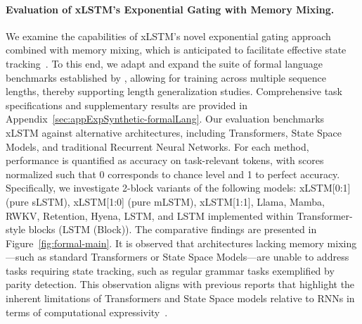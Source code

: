 \paragraph{Evaluation of xLSTM's Exponential Gating with Memory Mixing.} We examine the capabilities of xLSTM's novel exponential gating approach combined with memory mixing, which is anticipated to facilitate effective state tracking~\citep{Merrill:24, Merrill:23}. To this end, we adapt and expand the suite of formal language benchmarks established by \citet{Deletang:23}, allowing for training across multiple sequence lengths, thereby supporting length generalization studies. Comprehensive task specifications and supplementary results are provided in Appendix~\ref{sec:appExpSynthetic-formalLang}. 
Our evaluation benchmarks xLSTM against alternative architectures, including Transformers, State Space Models, and traditional Recurrent Neural Networks. For each method, performance is quantified as accuracy on task-relevant tokens, with scores normalized such that 0 corresponds to chance level and 1 to perfect accuracy. Specifically, we investigate 2-block variants of the following models: xLSTM[0:1] (pure sLSTM), xLSTM[1:0] (pure mLSTM), xLSTM[1:1], Llama, Mamba, RWKV, Retention, Hyena, LSTM, and LSTM implemented within Transformer-style blocks (LSTM (Block)). The comparative findings are presented in Figure~\ref{fig:formal-main}. 
It is observed that architectures lacking memory mixing—such as standard Transformers or State Space Models—are unable to address tasks requiring state tracking, such as regular grammar tasks exemplified by parity detection. This observation aligns with previous reports that highlight the inherent limitations of Transformers and State Space models relative to RNNs in terms of computational expressivity~\citep{Merrill:24, Merrill:23, Deletang:23}.

